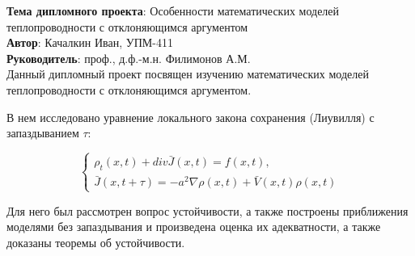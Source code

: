 \documentclass[a4paper, 12pt]{article}
\begin{document}
\textbf{Тема дипломного проекта}: Особенности математических моделей теплопроводности с отклоняющимся аргументом\\

\textbf{Автор}: Качалкин Иван, УПМ-411\\

\textbf{Руководитель}: проф., д.ф.-м.н. Филимонов А.М.\\

Данный дипломный проект посвящен изучению математических моделей теплопроводности с отклоняющимся аргументом.

В нем исследовано уравнение локального закона сохранения (Лиувилля) с запаздыванием $\tau$:

\begin{equation}
\left\{
\begin{aligned}
\rho_t(x,t) + div \bar{J}(x,t) = f(x,t),\\
\bar{J}(x,t+\tau) = -a^2 \nabla \rho(x,t) + \bar{V}(x,t) \rho(x,t)
\end{aligned}
\right.
\end{equation}

Для него был рассмотрен вопрос устойчивости, а также построены приближения моделями без запаздывания и произведена оценка их адекватности, а также доказаны теоремы об устойчивости.
\end{document}
